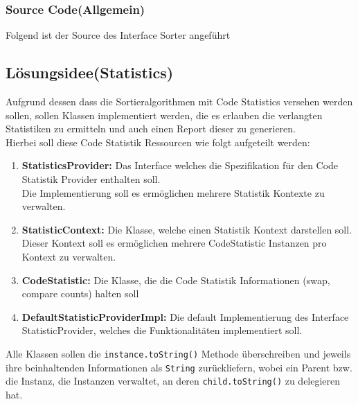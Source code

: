 \documentclass[11pt, a4paper, twoside]{article}   	%
\newcommand{\srcDir}{../src/main/java}
\newcommand{\mainPackage}{\srcDir/at/fhooe/swe4/lab3}
\newcommand{\ideaSection}{Lösungsidee}
\newcommand{\inlinecode}{\lstinline[style=inlineSource]}
\begin{document}
\subsubsection{Source Code\hspace{2mm}(Allgemein)}
Folgend ist der Source des Interface Sorter angeführt

\newpage
\subsection{\ideaSection \hspace{2mm}(Statistics)}
Aufgrund dessen dass die Sortieralgorithmen mit Code Statistics versehen werden sollen, sollen Klassen implementiert werden, die es erlauben die verlangten Statistiken zu ermitteln und auch einen Report dieser zu generieren.\\
Hierbei soll diese Code Statistik Ressourcen wie folgt aufgeteilt werden:
\begin{enumerate}
	\item \textbf{StatisticsProvider:} Das Interface welches die Spezifikation für den Code Statistik Provider enthalten soll.\\
	Die Implementierung soll es ermöglichen mehrere Statistik Kontexte zu verwalten.
	\item \textbf{StatisticContext:} Die Klasse, welche einen Statistik Kontext darstellen soll.\\
	Dieser Kontext soll es ermöglichen mehrere CodeStatistic Instanzen pro Kontext zu verwalten.
	\item \textbf{CodeStatistic:} Die Klasse, die die Code Statistik Informationen (swap, compare counts) halten soll
	\item \textbf{DefaultStatisticProviderImpl:} Die default Implementierung des Interface StatisticProvider, welches die Funktionalitäten implementiert soll.
\end{enumerate}
Alle Klassen sollen die \inlinecode{instance.toString()}  Methode überschreiben und jeweils ihre beinhaltenden Informationen als \inlinecode{String} zurückliefern, wobei ein Parent bzw. die Instanz, die Instanzen verwaltet, an deren \inlinecode{child.toString()} zu delegieren hat.
\newpage
\newpage
\end{document}
